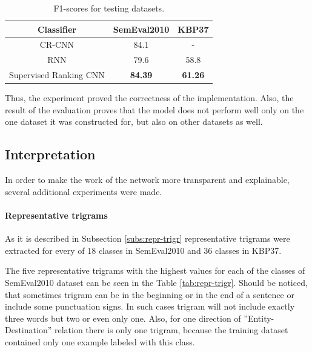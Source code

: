 \begin{table}
  \begin{center}
 \begin{tabular}{ | c | c | c | }
    \hline
    Classifier & SemEval2010 & KBP37 \\ \hline
    CR-CNN \cite{DBLP:journals/corr/SantosXZ15} & 84.1 & - \\ \hline
    RNN \cite{DBLP:journals/corr/ZhangW15a} & 79.6 & 58.8 \\ \hline
    Supervised Ranking CNN & \textbf{84.39} & \textbf{61.26} \\ \hline
    \end{tabular}
\caption[General domain supervised experiments results]{F1-scores for testing datasets.}
\label{tab:test-superv-general}
\end{center}
\end{table}

Thus, the experiment proved the correctness of the implementation. Also, the result of the evaluation
 proves that the model does not perform well only on the one dataset 
it was constructed for, but also on other datasets as well.

\subsection{Interpretation}
In order to make the work of the network more transparent and explainable, several additional 
experiments were made.

\paragraph{Representative trigrams} 
\label{par:gen-superv-repr-trig}
As it is described in Subsection \ref{subs:repr-trigr} representative 
trigrams were extracted for every of 18 classes in SemEval2010 and 36 classes in KBP37. 

The five representative trigrams with the highest values for each of the classes of SemEval2010 
dataset can be seen in the Table \ref{tab:repr-trigr}. Should be noticed, that sometimes trigram 
can be in the beginning or in the end of a sentence or include some punctuation signs. In such 
cases trigram will not include exactly three words but two or even only one. Also, for one direction of 
''Entity-Destination'' relation there is only one trigram, because the training dataset contained only 
one example labeled with this class.

